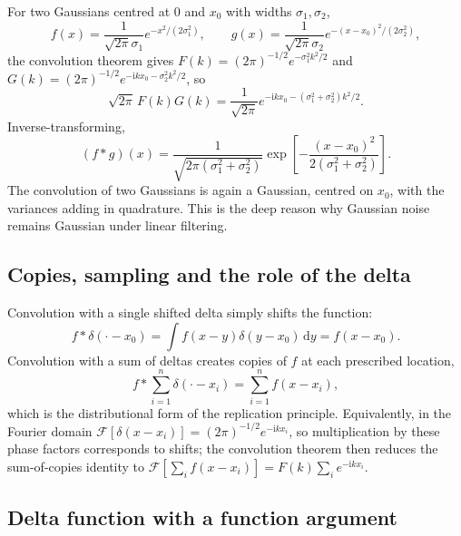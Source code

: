 \begin{example}
For two Gaussians centred at $0$ and $x_0$ with widths $\sigma_1,\sigma_2$,
\begin{equation}
f(x)=\frac{1}{\sqrt{2\pi}\sigma_1}e^{-x^2/(2\sigma_1^2)},\qquad
g(x)=\frac{1}{\sqrt{2\pi}\sigma_2}e^{-(x-x_0)^2/(2\sigma_2^2)},
\end{equation}
the convolution theorem gives $F(k)=(2\pi)^{-1/2}e^{-\sigma_1^2k^2/2}$ and $G(k)=(2\pi)^{-1/2}e^{-\mathrm{i}kx_0-\sigma_2^2k^2/2}$, so
\begin{equation}
\sqrt{2\pi}\,F(k)G(k)=\frac{1}{\sqrt{2\pi}}e^{-\mathrm{i}kx_0-(\sigma_1^2+\sigma_2^2)k^2/2}.
\end{equation}
Inverse-transforming,
\begin{equation}
(f*g)(x)=\frac{1}{\sqrt{2\pi(\sigma_1^2+\sigma_2^2)}}\exp\!\left[-\frac{(x-x_0)^2}{2(\sigma_1^2+\sigma_2^2)}\right].
\end{equation}
The convolution of two Gaussians is again a Gaussian, centred on $x_0$, with the variances adding in quadrature. This is the deep reason why Gaussian noise remains Gaussian under linear filtering.
\end{example}

\subsection{Copies, sampling and the role of the delta}

Convolution with a single shifted delta simply shifts the function:
\begin{equation}
f*\delta(\cdot-x_0)=\int f(x-y)\delta(y-x_0)\,\mathrm{d}y=f(x-x_0).
\end{equation}
Convolution with a sum of deltas creates copies of $f$ at each prescribed location,
\begin{equation}
f*\sum_{i=1}^n\delta(\cdot-x_i)=\sum_{i=1}^n f(x-x_i),
\end{equation}
which is the distributional form of the replication principle. Equivalently, in the Fourier domain $\mathcal{F}[\delta(x-x_i)]=(2\pi)^{-1/2}e^{-\mathrm{i}kx_i}$, so multiplication by these phase factors corresponds to shifts; the convolution theorem then reduces the sum-of-copies identity to $\mathcal{F}[\sum_i f(x-x_i)]=F(k)\sum_i e^{-\mathrm{i}kx_i}$.

\subsection{Delta function with a function argument}

